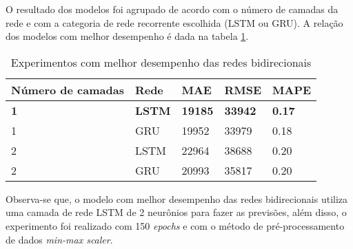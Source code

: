 O resultado dos modelos foi agrupado de acordo com o número de camadas da 
rede e com a categoria de rede recorrente escolhida (LSTM ou GRU). A relação dos modelos com 
melhor desempenho é dada na tabela \ref{tab:res-bi}.

\begin{table}[H]
    \centering
    \caption{Experimentos com melhor desempenho das redes bidirecionais}
    \begin{tabular}{lllll}
    \toprule
    Número de camadas & Rede & MAE & RMSE & MAPE \\
    \midrule
    \textbf{1} & \textbf{LSTM} & \textbf{19185}  & \textbf{33942} & \textbf{0.17}\\
    1 & GRU  & 19952  & 33979  & 0.18 \\
    2 & LSTM & 22964  & 38688 & 0.20  \\
    2 & GRU  & 20993  & 35817  & 0.20 \\
    \bottomrule
    \end{tabular}
    \label{tab:res-bi}
\end{table}

Observa-se que, o modelo com melhor desempenho das redes bidirecionais 
utiliza uma camada de rede LSTM de 2 neurônios para fazer as previsões, além disso, o experimento foi 
realizado com 150 \textit{epochs} e com o método de pré-processamento de dados 
\textit{min-max scaler}.